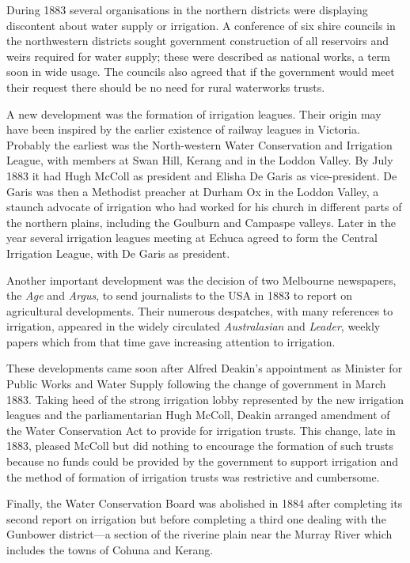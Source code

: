 During 1883 several organisations in the northern districts were
displaying discontent about water supply or irrigation.  A conference
of six shire councils in the northwestern districts sought government
construction of all reservoirs and weirs required for water supply;
these were described as national works, a term soon in wide
usage.  The councils also agreed that
if the government would meet their request there should be no need for
rural waterworks trusts.

A new development was the formation of irrigation leagues.  Their
origin may have been inspired by the earlier existence of railway
leagues in Victoria.  Probably the earliest was the North-western
Water Conservation and Irrigation League, with members at Swan Hill,
Kerang and in the Loddon Valley.  By July 1883 it had Hugh McColl as
president and Elisha De Garis as vice-president.  De Garis was then a Methodist preacher at Durham Ox in
the Loddon Valley, a staunch advocate of irrigation who had worked for
his church in different parts of the northern plains, including the
Goulburn and Campaspe valleys.  Later in the year several irrigation
leagues meeting at Echuca agreed to form the Central Irrigation
League, with De Garis as president.

Another important development was the decision of two Melbourne
newspapers, the \textsl{Age} and \textsl{Argus}, to send journalists
to the USA in 1883 to report on agricultural developments.  Their
numerous despatches, with many references to irrigation, appeared in
the widely circulated \textsl{Australasian} and \textsl{Leader},
weekly papers which from that time gave increasing attention to
irrigation.

These developments came soon after Alfred Deakin's appointment as
Minister for Public Works and Water Supply following the change of
government in March 1883.  Taking heed of the strong irrigation lobby
represented by the new irrigation leagues and the parliamentarian Hugh
McColl, Deakin arranged amendment of the Water Conservation Act to
provide for irrigation trusts.  This change, late in 1883, pleased
McColl but did nothing to encourage the formation of such trusts
because no funds could be provided by the government to support
irrigation and the method of formation of irrigation trusts was
restrictive and cumbersome.

Finally, the Water Conservation Board was abolished in 1884 after
completing its second report on irrigation but before completing a
third one dealing with the Gunbower district---a section of the
riverine plain near the Murray River which includes the towns of
Cohuna and Kerang.

